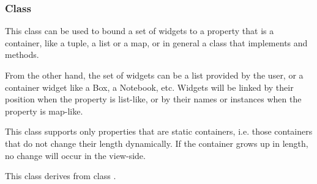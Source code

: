 \subsubsection{Class }
This class can be used to bound a set of widgets to a property that
is a container, like a tuple, a list or a map, or in general a class
that implements  and
 methods.

From the other hand, the set of widgets can be a list provided by
the user, or a container widget like a Box, a Notebook, etc.
Widgets will be linked by their position when the property is
list-like, or by their names or instances when the property is
map-like.

This class supports only properties that are static containers,
i.e. those containers that do not change their length
dynamically. If the container grows up in length, no change will
occur in the view-side.

This class derives from class .

